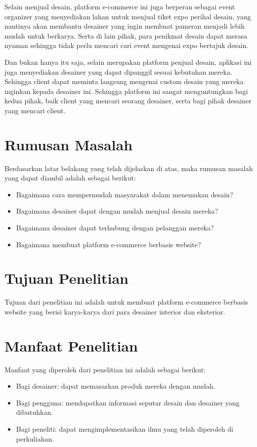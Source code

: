 \par
Selain menjual desain, platform e-commerce ini juga berperan sebagai event organizer yang menyediakan lahan untuk menjual tiket expo perihal desain, yang nantinya akan membantu desainer yang ingin membuat pameran menjadi lebih mudah untuk berkarya. Serta di lain pihak, para penikmat desain dapat merasa nyaman sehingga tidak perlu mencari cari event mengenai expo bertajuk desain.
\par
Dan bukan hanya itu saja, selain merupakan platform penjual desain, aplikasi ini juga menyediakan desainer yang dapat dipanggil sesuai kebutuhan mereka. Sehingga client dapat meminta langsung mengenai custom desain yang mereka inginkan kepada desainer ini. Sehingga platform ini sangat menguntungkan bagi kedua pihak, baik client yang mencari seorang desainer, serta bagi pihak desainer yang mencari client.

\section{Rumusan Masalah}
Berdasarkan latar belakang yang telah dijelaskan di atas, maka rumusan masalah yang dapat diambil adalah sebagai berikut:
\begin{itemize}
	\item Bagaimana cara mempermudah masyarakat dalam menemukan desain?
	\item Bagaimana desainer dapat dengan mudah menjual desain mereka?
	\item Bagaimana desainer dapat terhubung dengan pelanggan mereka?
	\item Bagaimana membuat platform e-commerce berbasis website?
\end{itemize}

\section{Tujuan Penelitian}
Tujuan dari penelitian ini adalah untuk membuat platform e-commerce berbasis website yang berisi karya-karya dari para desainer interior dan eksterior.

\section{Manfaat Penelitian}
Manfaat yang diperoleh dari penelitian ini adalah sebagai berikut:
\begin{itemize}
	\item Bagi desainer: dapat memasarkan produk mereka dengan mudah.
	\item Bagi pengguna: mendapatkan informasi seputar desain dan desainer yang dibutuhkan.
	\item Bagi peneliti: dapat mengimplementasikan ilmu yang telah diperoleh di perkuliahan.
\end{itemize}


